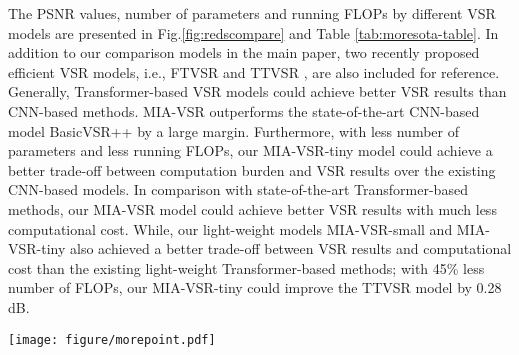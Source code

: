 \documentclass[10pt,twocolumn,letterpaper]{article}
\begin{document}
The PSNR values, number of parameters and running FLOPs by different VSR models are presented in Fig.\ref{fig:redscompare} and Table \ref{tab:moresota-table}.
%
In addition to our comparison models in the main paper, two recently proposed efficient VSR models, i.e., FTVSR \cite{qiu2022learning} and TTVSR \cite{liu2022learning}, are
also included for reference.
%
Generally, Transformer-based VSR models could achieve better VSR results than CNN-based methods.
%
MIA-VSR outperforms the state-of-the-art 
CNN-based model BasicVSR++ by a large margin.
%
Furthermore, with less number of parameters and less running FLOPs, our MIA-VSR-tiny model could achieve a better trade-off between computation burden and VSR results over the existing CNN-based models.
%
In comparison with state-of-the-art Transformer-based methods, 
our MIA-VSR model could achieve better VSR results with much less computational cost.
%
While, our light-weight models MIA-VSR-small and MIA-VSR-tiny also achieved a better trade-off between VSR results and computational cost
than the existing light-weight Transformer-based methods;
with 45\% less number of FLOPs, our MIA-VSR-tiny could improve the TTVSR model by 0.28 dB.
\begin{figure*}[h]
\centering
\texttt{[image: figure/morepoint.pdf]}
\caption{\textbf{PSNR(dB) and FLOPs(G) comparison on the REDS4 \cite{nah2019ntire} dataset.} 
In comparison with the existing video super-resolution methods, our proposed MIA-VSR model, MIA-VSR-small and MIA-VSR-tiny could obtain better trade-offs between VSR results and computational cost.
%
Our fine-tuned model MIA-VSR$\dagger$ outperforms the current state-of-the-art model by more than 0.1 dB with nearly 40\% less number of FLOPs.  
%
Our light-weight model MIA-VSR-tiny outperforms the recent light-weight Transformer-based VSR model TTVSR\cite{liu2022learning} by 0.28 dB, with 45\% less number of FLOPs.
%
More details can be found in Section \ref{b}.
}
\label{fig:redscompare}
\end{figure*}
\end{document}
